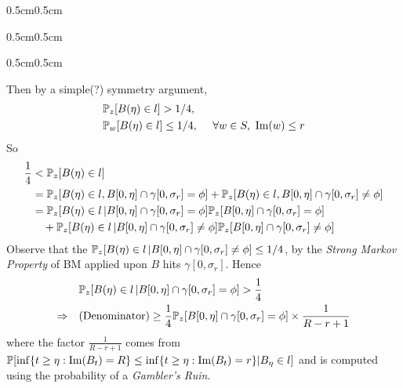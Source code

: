 \documentclass[12pt,a4paper]{article}
\newenvironment{proof}
{\begin{changemargin}{0.5cm}{0.5cm} 
	}%
	{\end{changemargin}
}
\newenvironment{subproof}
{\begin{changemargin}{0.5cm}{0.5cm} 
	}%
	{\end{changemargin}
}
\newenvironment{p}
{\begin{proof} 
	}%
	{\end{proof}
}
\begin{document}
\begin{p}
\begin{subproof}
\begin{subproof}
Then by a simple(?) symmetry argument,
\begin{align*}
& \mathbb{P}_z [B(\eta) \in l] > 1/4, \\
& \mathbb{P}_w [B(\eta)\in l] \leq 1/4,\quad \,\, \forall w\in S, \,\, \text{Im}(w) \leq r
\end{align*}
So
\begin{align*}
\frac{1}{4} &< \mathbb{P}_z [B(\eta) \in l] \\
&= \mathbb{P}_z [B(\eta) \in l, B[0, \eta] \cap \gamma[0, \sigma_r] = \phi] + \mathbb{P}_z [B(\eta) \in l, B[0, \eta] \cap \gamma[0, \sigma_r] \neq \phi] \\
&= \mathbb{P}_z[B(\eta) \in l \, | B[0, \eta] \cap \gamma[0, \sigma_r] = \phi] \mathbb{P}_z[B[0, \eta]\cap \gamma[0, \sigma_r] = \phi] \\
& \quad + \mathbb{P}_z [B(\eta)\in l \, | B[0,\eta] \cap \gamma[0, \sigma_r] \neq \phi] \mathbb{P}_z[B[0,\eta] \cap \gamma[0, \sigma_r] \neq \phi]  
\end{align*}
Observe that the $\mathbb{P}_z [B(\eta)\in l \,| B[0,\eta] \cap \gamma[0, \sigma_r] \neq \phi] \leq 1/4$, by the \emph{Strong Markov Property} of BM applied upon $B$ hits $\gamma[0, \sigma_r]$. Hence
\begin{align*}
& \mathbb{P}_z [B(\eta) \in l \,| B[0, \eta] \cap \gamma[0, \sigma_r] =\phi] >\frac{1}{4} \\
\Rightarrow \quad & \text{(Denominator)} \geq \frac{1}{4} \mathbb{P}_z [B[0, \eta]\cap \gamma[0, \sigma_r]=\phi] \times \frac{1}{R-r+1}
\end{align*}
where the factor $\frac{1}{R-r+1}$ comes from $\mathbb{P}[\inf\{t\geq \eta : \text{Im}(B_t)= R\} \leq \inf\{t\geq \eta : \text{Im}(B_t)= r \} | B_{\eta} \in l]$ and is computed using the probability of a \emph{Gambler's Ruin}.
\s


\end{subproof}
\end{subproof}
\end{p}
\end{document}
